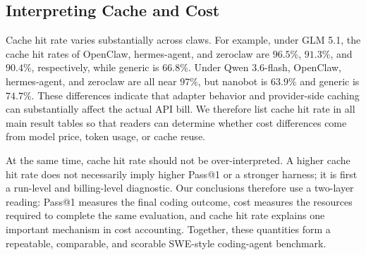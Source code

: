 \subsection{Interpreting Cache and Cost}\label{sec:cost_perf}

Cache hit rate varies substantially across claws. For example, under GLM 5.1, the cache hit rates of OpenClaw, hermes-agent, and zeroclaw are $96.5\%$, $91.3\%$, and $90.4\%$, respectively, while generic is $66.8\%$. Under Qwen 3.6-flash, OpenClaw, hermes-agent, and zeroclaw are all near $97\%$, but nanobot is $63.9\%$ and generic is $74.7\%$. These differences indicate that adapter behavior and provider-side caching can substantially affect the actual API bill. We therefore list cache hit rate in all main result tables so that readers can determine whether cost differences come from model price, token usage, or cache reuse.

At the same time, cache hit rate should not be over-interpreted. A higher cache hit rate does not necessarily imply higher Pass@1 or a stronger harness; it is first a run-level and billing-level diagnostic. Our conclusions therefore use a two-layer reading: Pass@1 measures the final coding outcome, cost measures the resources required to complete the same evaluation, and cache hit rate explains one important mechanism in cost accounting. Together, these quantities form a repeatable, comparable, and scorable SWE-style coding-agent benchmark.
